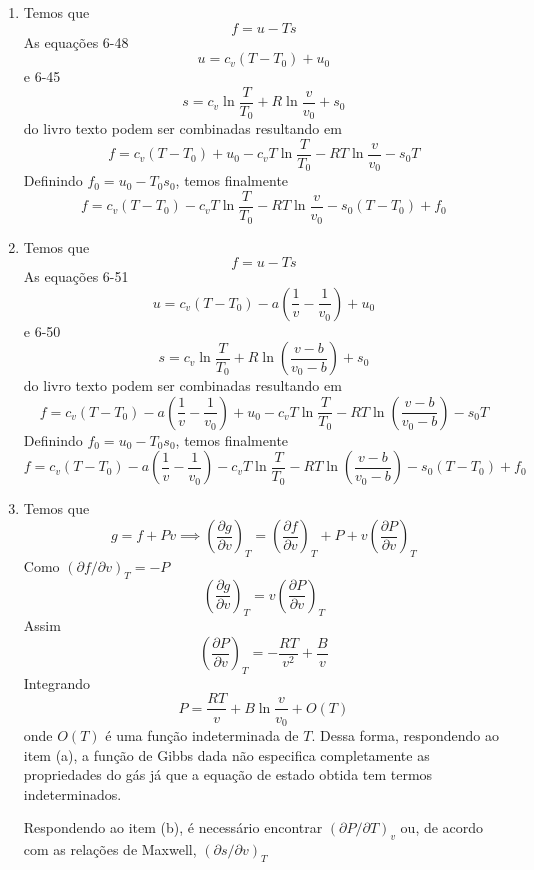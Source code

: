 \documentclass[12pt,a4paper,brazilian]{article}
\def\Description{Termodinâmica -- Prova 2}
\begin{document}
\newpage
\def\Description{Termodinâmica -- Gabarito}
\newcommand{\diff}[2]{\left(\frac{\partial #1}{\partial #2}\right)}

\begin{enumerate}
    \item Temos que
        \[
            f=u-Ts
        \]
        As equações 6-48
        \[
            u=c_v(T-T_0) +u_0
        \]
        e 6-45
        \[
            s=c_v\ln\frac{T}{T_0}+R\ln\frac{v}{v_0} + s_0
        \]
        do livro texto podem ser combinadas resultando em
        \[
            f=c_v(T-T_0) +u_0 - 
            c_vT\ln\frac{T}{T_0}-RT\ln\frac{v}{v_0} - s_0T
        \]
        Definindo \(f_0 = u_0-T_0s_0\), temos finalmente
        \[
            f=c_v(T-T_0) - 
            c_vT\ln\frac{T}{T_0}-RT\ln\frac{v}{v_0} - s_0(T-T_0) +f_0
        \]

    \item Temos que
        \[
            f=u-Ts
        \]
        As equações 6-51
        \[
            u=c_v(T-T_0)-a\left(\frac{1}{v}-\frac{1}{v_0}\right)+ u_0
        \]
        e 6-50 
        \[
            s=c_v\ln\frac{T}{T_0}+R\ln\left(\frac{v-b}{v_0-b}\right)+s_0
        \]
        do livro texto podem ser combinadas resultando em
        \[
            f=
            c_v(T-T_0)-a\left(\frac{1}{v}-\frac{1}{v_0}\right)+ u_0 -
            c_vT\ln\frac{T}{T_0}-RT\ln\left(\frac{v-b}{v_0-b}\right)-s_0T
        \]
        Definindo \(f_0 = u_0-T_0s_0\), temos finalmente
        \[
            f=
            c_v(T-T_0)-a\left(\frac{1}{v}-\frac{1}{v_0}\right) -
            c_vT\ln\frac{T}{T_0}-RT\ln\left(\frac{v-b}{v_0-b}\right)-s_0(T-T_0)+f_0
        \]

    \item Temos que 
        \[
            g=f+Pv \implies \diff{g}{v}_T = \diff{f}{v}_T + P + v\diff{P}{v}_T
        \]
        Como \((\partial f/\partial v)_T = -P\)
        \[
            \diff{g}{v}_T = v\diff{P}{v}_T
        \]
        Assim
        \[
            \diff{P}{v}_T = -\frac{RT}{v^2}+\frac{B}{v}
        \]
        Integrando
        \[
            P = \frac{RT}{v}+B\ln\frac{v}{v_0} + O(T)
        \]
        onde \(O(T)\) é uma função indeterminada de \(T\). Dessa forma, respondendo ao item (a),
        a função de Gibbs dada não especifica completamente as propriedades do gás já que a equação 
        de estado obtida tem termos indeterminados.

        Respondendo ao item (b), é necessário encontrar \((\partial P/\partial T)_v\) ou, de acordo com
        as relações de Maxwell, \((\partial s/\partial v)_T\)


\end{enumerate}
\end{document}
